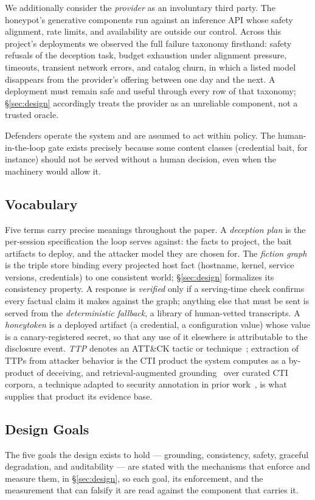 We additionally consider the \emph{provider} as an involuntary third
party. The honeypot's generative components run against an inference API
whose safety alignment, rate limits, and availability are outside our
control. Across this project's deployments we observed the full failure
taxonomy firsthand: safety refusals of the deception task, budget
exhaustion under alignment pressure, timeouts, transient network
errors, and catalog churn, in which a listed model disappears from the
provider's offering between one day and the next. A deployment must remain safe and useful
through every row of that taxonomy; \S\ref{sec:design} accordingly treats
the provider as an unreliable component, not a trusted oracle.

Defenders operate the system and are assumed to act within policy. The human-in-the-loop
gate exists precisely because some content classes (credential bait, for
instance) should not be served without a human decision, even when the
machinery would allow it.

\subsection{Vocabulary}
\label{sec:vocab}
Five terms carry precise meanings throughout the paper. A \emph{deception
plan} is the per-session specification the loop serves against: the facts
to project, the bait artifacts to deploy, and the attacker model they are
chosen for. The \emph{fiction graph} is the triple store binding every
projected host fact (hostname, kernel, service versions, credentials) to
one consistent world; \S\ref{sec:design} formalizes its consistency
property. A response is \emph{verified} only if a serving-time check
confirms every factual claim it makes against the graph; anything else
that must be sent is served from the \emph{deterministic fallback}, a
library of human-vetted transcripts. A \emph{honeytoken} is a deployed
artifact (a credential, a configuration value) whose value is a
canary-registered secret, so that any use of it elsewhere is attributable
to the disclosure event. \emph{TTP} denotes an ATT\&CK tactic or
technique~\cite{roy2023}; extraction of TTPs from attacker behavior is
the CTI product the system computes as a by-product of deceiving, and
retrieval-augmented grounding~\cite{lewis2020} over curated CTI corpora,
a technique adapted to security annotation in prior
work~\cite{lekssays2025}, is what supplies that product its evidence base.

\subsection{Design Goals}
\label{sec:goals}
The five goals the design exists to hold --- grounding, consistency,
safety, graceful degradation, and auditability --- are stated with the
mechanisms that enforce and measure them, in \S\ref{sec:design}, so
each goal, its enforcement, and the measurement that can falsify it are
read against the component that carries it.
